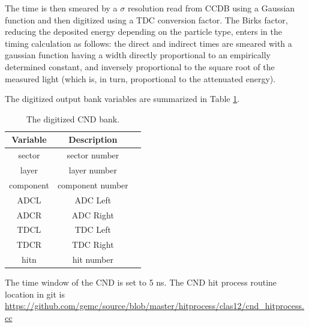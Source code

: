 The time is then smeared by a $\sigma$ resolution read from CCDB using a Gaussian function and then digitized using a TDC conversion factor.
The Birks factor, reducing the deposited
energy depending on the particle type, enters in the timing calculation as
follows: the direct and indirect times are smeared with a gaussian
function having a width directly proportional to an empirically determined
constant, and inversely proportional to the square root of the measured
light (which is, in turn, proportional to the attenuated energy).



The digitized output bank variables are summarized in Table \ref{tab:cndBank}.

\begin{table}[h]
	\begin{center}
		\begin{tabular}{| c | c | c |}
			\hline \hline
			Variable         & Description   \\
			\hline
              sector  &                                     sector number     \\
               layer  &                                      layer number     \\
           component  &                                  component number     \\
                ADCL  &                                          ADC Left     \\
                ADCR  &                                         ADC Right     \\
                TDCL  &                                          TDC Left     \\
                TDCR  &                                         TDC Right     \\
                hitn  &                                        hit number     \\
			\hline \hline
		\end{tabular}
	\end{center}
	\caption{The digitized CND bank.}\label{tab:cndBank}
\end{table}


The time window  of the CND is set to 5 ns.
The CND hit process routine location in git is \url{https://github.com/gemc/source/blob/master/hitprocess/clas12/cnd_hitprocess.cc}
